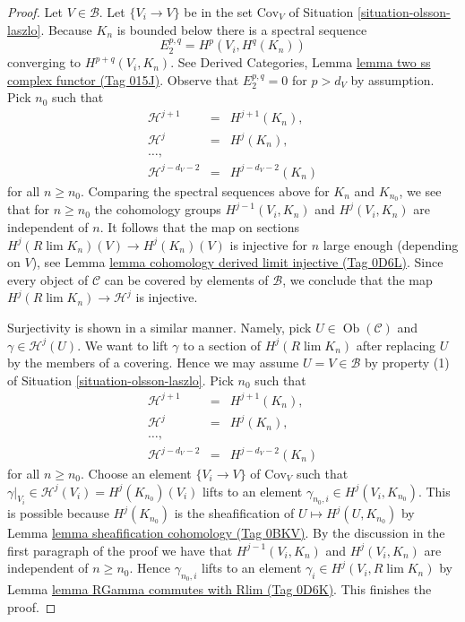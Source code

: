 \documentclass{amsart}
\theoremstyle{plain}
\theoremstyle{definition}
\theoremstyle{remark}
\numberwithin{equation}{subsection}
\def\lim{\mathop{\mathrm{lim}}\nolimits}
\def\Ob{\mathop{\mathrm{Ob}}\nolimits}
\begin{document}
\begin{proof}
Let $V \in \mathcal{B}$. Let $\{V_i \to V\}$ be in the set
$\text{Cov}_V$ of Situation \ref{situation-olsson-laszlo}.
Because $K_n$ is bounded below there is a spectral sequence
$$
E_2^{p, q} = H^p(V_i, H^q(K_n))
$$
converging to $H^{p + q}(V_i, K_n)$. See
Derived Categories, Lemma \href{https://stacks.math.columbia.edu/tag/015J}{lemma two ss complex functor (Tag 015J)}.
Observe that $E_2^{p, q} = 0$
for $p > d_V$ by assumption. Pick $n_0$ such that
$$
\begin{matrix}
\mathcal{H}^{j + 1} & = & H^{j + 1}(K_n), \\
\mathcal{H}^j & = & H^j(K_n), \\
\ldots, \\
\mathcal{H}^{j - d_V - 2} & = & H^{j - d_V - 2}(K_n)
\end{matrix}
$$
for all $n \geq n_0$. Comparing the spectral sequences above
for $K_n$ and $K_{n_0}$, we see that for $n \geq n_0$ the
cohomology groups $H^{j - 1}(V_i, K_n)$ and $H^j(V_i, K_n)$
are independent of $n$. It follows that the map on sections
$H^j(R\lim K_n)(V) \to H^j(K_n)(V)$ is injective for $n$ large
enough (depending on $V$), see
Lemma \href{https://stacks.math.columbia.edu/tag/0D6L}{lemma cohomology derived limit injective (Tag 0D6L)}.
Since every object of $\mathcal{C}$ can be covered by elements
of $\mathcal{B}$, we conclude that the map
$H^j(R\lim K_n) \to \mathcal{H}^j$ is injective.

\medskip\noindent
Surjectivity is shown in a similar manner. Namely, pick
$U \in \Ob(\mathcal{C})$ and $\gamma \in \mathcal{H}^j(U)$.
We want to lift $\gamma$ to a section of $H^j(R\lim K_n)$
after replacing $U$ by the members of a covering. Hence we may
assume $U = V \in \mathcal{B}$ by property (1) of
Situation \ref{situation-olsson-laszlo}.
Pick $n_0$ such that
$$
\begin{matrix}
\mathcal{H}^{j + 1} & = & H^{j + 1}(K_n), \\
\mathcal{H}^j & = & H^j(K_n), \\
\ldots, \\
\mathcal{H}^{j - d_V - 2} & = & H^{j - d_V - 2}(K_n)
\end{matrix}
$$
for all $n \geq n_0$. Choose an element $\{V_i \to V\}$ of
$\text{Cov}_V$ such that
$\gamma|_{V_i} \in \mathcal{H}^j(V_i) = H^j(K_{n_0})(V_i)$
lifts to an element $\gamma_{n_0, i} \in H^j(V_i, K_{n_0})$.
This is possible because $H^j(K_{n_0})$ is the sheafification
of $U \mapsto H^j(U, K_{n_0})$ by Lemma \href{https://stacks.math.columbia.edu/tag/0BKV}{lemma sheafification cohomology (Tag 0BKV)}.
By the discussion in the first paragraph of the proof we have that
$H^{j - 1}(V_i, K_n)$ and $H^j(V_i, K_n)$
are independent of $n \geq n_0$. Hence
$\gamma_{n_0, i}$ lifts to an element
$\gamma_i \in H^j(V_i, R\lim K_n)$ by
Lemma \href{https://stacks.math.columbia.edu/tag/0D6K}{lemma RGamma commutes with Rlim (Tag 0D6K)}.
This finishes the proof.
\end{proof}
\end{document}
